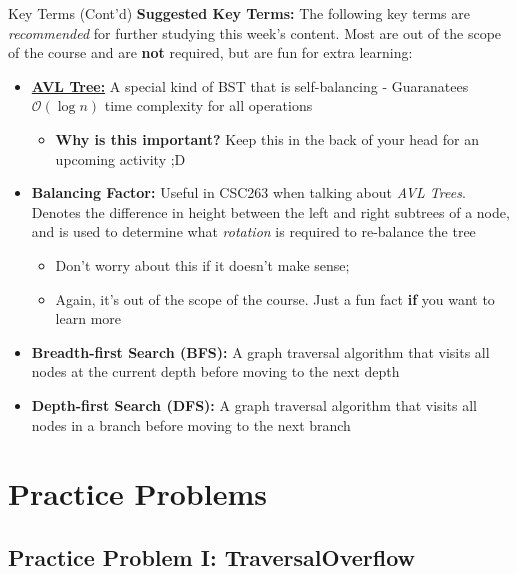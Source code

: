 \documentclass[hyperref={colorlinks,citecolor=blue,linkcolor=blue,urlcolor=blue}, aspectratio=1610]{beamer}
\begin{document}
\begin{frame}{Key Terms (Cont'd)}
    \textbf{Suggested Key Terms:} The following key terms are \textit{recommended} for further studying this week's content. Most are out of the scope of the course and are \textbf{not} required, but are fun for extra learning:

    \begin{itemize}
      \item \textbf{\href{https://www.youtube.com/watch?v=mGF61O21W-c}{AVL Tree:} }A special kind of BST that is self-balancing - Guaranatees $\mathcal{O}(\log n)$ time complexity for all operations
      \begin{itemize}
        \item \textbf{Why is this important?} Keep this in the back of your head for an upcoming activity ;D
      \end{itemize}
      \item \textbf{Balancing Factor: }Useful in CSC263 when talking about \textit{AVL Trees}. Denotes the difference in height between the left and right subtrees of a node, and is used to determine what \textit{rotation} is required to re-balance the tree
      \begin{itemize}
        \item Don't worry about this if it doesn't make sense; 
        \item Again, it's out of the scope of the course. Just a fun fact \textbf{if} you want to learn more 
      \end{itemize}
      \item \textbf{Breadth-first Search (BFS): }A graph traversal algorithm that visits all nodes at the current depth before moving to the next depth
      \item \textbf{Depth-first Search (DFS): }A graph traversal algorithm that visits all nodes in a branch before moving to the next branch
    \end{itemize}
\end{frame}


\section{Practice Problems}
\subsection{Practice Problem I: TraversalOverflow}
\end{document}
